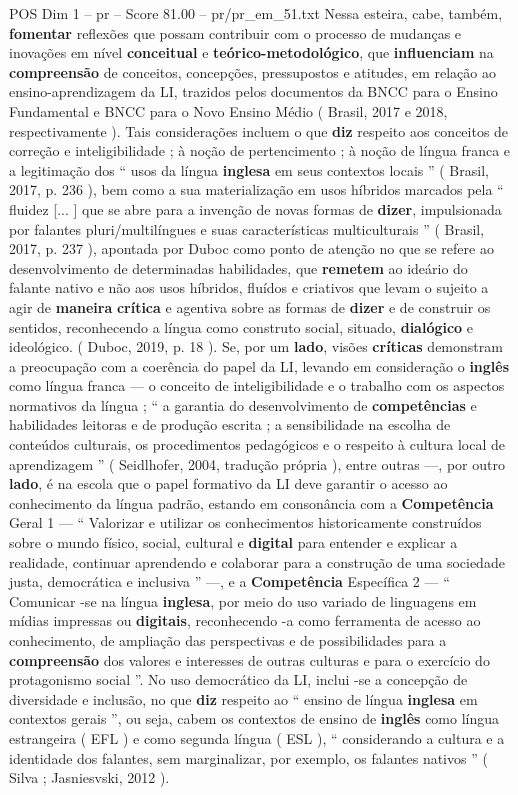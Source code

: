 \begin{textsample}{POS Dim 1 – pr – Score 81.00 – pr/pr\_em\_51.txt}
Nessa esteira, cabe, também, \textbf{fomentar} reflexões que possam contribuir com o processo de mudanças e inovações em nível \textbf{conceitual} e \textbf{teórico-metodológico}, que \textbf{influenciam} na \textbf{compreensão} de conceitos, concepções, pressupostos e atitudes, em relação ao ensino-aprendizagem da LI, trazidos pelos documentos da BNCC para o Ensino Fundamental e BNCC para o Novo Ensino Médio ( Brasil, 2017 e 2018, respectivamente ).
Tais considerações incluem o que \textbf{diz} respeito aos conceitos de correção e inteligibilidade ; à noção de pertencimento ; à noção de língua franca e a legitimação dos “ usos da língua \textbf{inglesa} em seus contextos locais ” ( Brasil, 2017, p. 236 ), bem como a sua materialização em usos híbridos marcados pela “ fluidez [... ] que se abre para a invenção de novas formas de \textbf{dizer}, impulsionada por falantes pluri/multilíngues e suas características multiculturais ” ( Brasil, 2017, p. 237 ), apontada por Duboc como ponto de atenção no que se refere ao desenvolvimento de determinadas habilidades, que \textbf{remetem} ao ideário do falante nativo e não aos usos híbridos, fluídos e criativos que levam o sujeito a agir de \textbf{maneira} \textbf{crítica} e agentiva sobre as formas de \textbf{dizer} e de construir os sentidos, reconhecendo a língua como construto social, situado, \textbf{dialógico} e ideológico. ( Duboc, 2019, p. 18 ).
Se, por um \textbf{lado}, visões \textbf{críticas} demonstram a preocupação com a coerência do papel da LI, levando em consideração o \textbf{inglês} como língua franca — o conceito de inteligibilidade e o trabalho com os aspectos normativos da língua ; “ a garantia do desenvolvimento de \textbf{competências} e habilidades leitoras e de produção escrita ; a sensibilidade na escolha de conteúdos culturais, os procedimentos pedagógicos e o respeito à cultura local de aprendizagem ” ( Seidlhofer, 2004, tradução própria ), entre outras —, por outro \textbf{lado}, é na escola que o papel formativo da LI deve garantir o acesso ao conhecimento da língua padrão, estando em consonância com a \textbf{Competência} Geral 1 — “ Valorizar e utilizar os conhecimentos historicamente construídos sobre o mundo físico, social, cultural e \textbf{digital} para entender e explicar a realidade, continuar aprendendo e colaborar para a construção de uma sociedade justa, democrática e inclusiva ” —, e a \textbf{Competência} Específica 2 — “ Comunicar -se na língua \textbf{inglesa}, por meio do uso variado de linguagens em mídias impressas ou \textbf{digitais}, reconhecendo -a como ferramenta de acesso ao conhecimento, de ampliação das perspectivas e de possibilidades para a \textbf{compreensão} dos valores e interesses de outras culturas e para o exercício do protagonismo social ”.
No uso democrático da LI, inclui -se a concepção de diversidade e inclusão, no que \textbf{diz} respeito ao “ ensino de língua \textbf{inglesa} em contextos gerais ”, ou seja, cabem os contextos de ensino de \textbf{inglês} como língua estrangeira ( EFL ) e como segunda língua ( ESL ), “ considerando a cultura e a identidade dos falantes, sem marginalizar, por exemplo, os falantes nativos ” ( Silva ; Jasniesvski, 2012 ).


\end{textsample}
